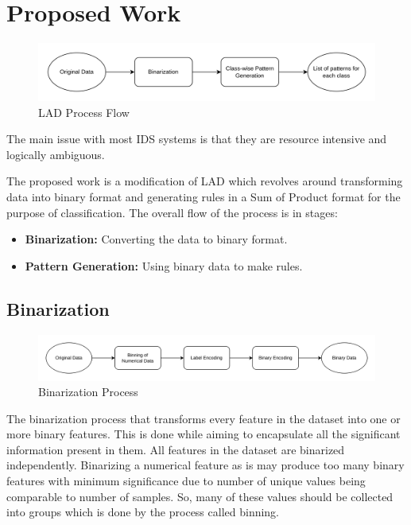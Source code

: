 \documentclass[pdflatex,sn-mathphys-num]{sn-jnl}%
\let\oldcaption\caption
\renewcommand{\caption}[1]{\oldcaption{\centering #1}}
\theoremstyle{thmstyleone}%
\theoremstyle{thmstyletwo}%
\theoremstyle{thmstylethree}%
\begin{document}
\section{Proposed Work}\label{sec:Methodology}
\begin{figure}[ht!]
    \centering
    \includegraphics[width=\linewidth]{Methedology.drawio.png}
    \caption{LAD Process Flow}
    \label{fig:LAD}
\end{figure}

The main issue with most IDS systems is that they are resource intensive and logically ambiguous.

The proposed work is a modification of LAD which revolves around transforming data into binary format and generating rules in a Sum of Product format for the purpose of classification. The overall flow of the process is in stages: 

\begin{itemize}
    \item \textbf{Binarization:} Converting the data to binary format.
    \item \textbf{Pattern Generation:} Using binary data to make rules.
\end{itemize}


\subsection{Binarization}

\begin{figure}[ht!]
    \centering
    \includegraphics[width=\linewidth]{Binarization.drawio.png}
    \caption{Binarization Process}
    \label{fig:Binarization}
\end{figure}

The binarization process that transforms every feature in the dataset into one or more binary features.
This is done while aiming to encapsulate all the significant information present in them.
All features in the dataset are binarized independently.
Binarizing a numerical feature as is may produce too many binary features with minimum significance due to number of unique values being comparable to number of samples.
So, many of these values should be collected into groups which is done by the process called binning.
\end{document}
